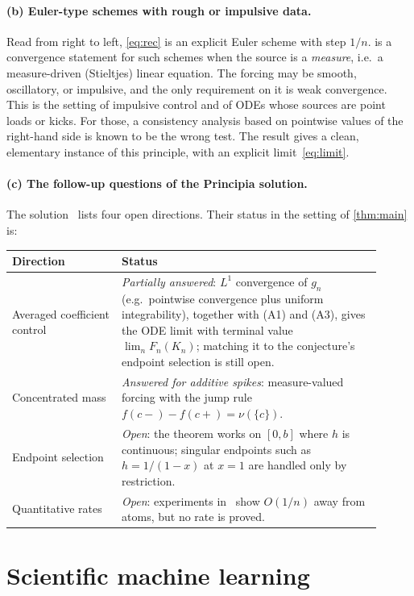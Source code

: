 \documentclass[11pt]{article}
\theoremstyle{plain}
\theoremstyle{remark}
\begin{document}
\paragraph{(b) Euler-type schemes with rough or impulsive data.}
Read from right to left, \eqref{eq:rec} is an explicit Euler scheme with step $1/n$.
 is a convergence statement for such schemes when the source is a
\emph{measure}, i.e.\ a measure-driven (Stieltjes) linear equation. The forcing may be
smooth, oscillatory, or impulsive, and the only requirement on it is weak convergence. This
is the setting of impulsive control and of ODEs whose sources are point loads or kicks.
For those, a consistency analysis based on pointwise values of the right-hand side is
known to be the wrong test. The result gives a clean, elementary instance of this
principle, with an explicit limit~\eqref{eq:limit}.

\paragraph{(c) The follow-up questions of the Principia solution.}
The solution~\cite{principia} lists four open directions. Their status in the setting of
\cref{thm:main} is:
\begin{center}
\small
\begin{tabular}{@{}p{0.27\linewidth}p{0.64\linewidth}@{}}
\toprule
Direction & Status \\
\midrule
Averaged coefficient control & \emph{Partially answered}: $L^1$ convergence of $g_n$ (e.g.\ pointwise
convergence plus uniform integrability), together with (A1) and (A3), gives the ODE limit with
terminal value $\lim_n F_n(K_n)$; matching it to the conjecture's endpoint selection is still open. \\
Concentrated mass & \emph{Answered for additive spikes}: measure-valued forcing with the jump
rule $f(c-)-f(c+)=\nu(\{c\})$. \\
Endpoint selection & \emph{Open}: the theorem works on $[0,b]$ where $h$ is continuous;
singular endpoints such as $h=1/(1-x)$ at $x=1$ are handled only by restriction. \\
Quantitative rates & \emph{Open}: experiments in~\cite{companion} show $O(1/n)$ away from
atoms, but no rate is proved. \\
\bottomrule
\end{tabular}
\end{center}

\section{Scientific machine learning}\label{sec:sciml}
\end{document}
